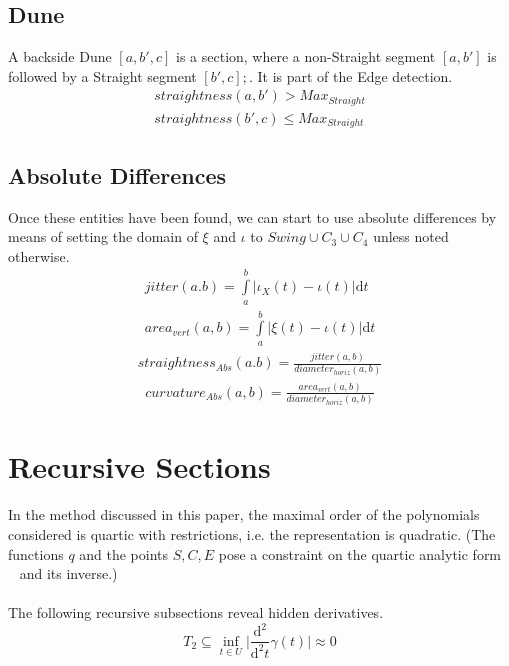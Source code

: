 \documentclass{report}
\begin{document}
\subsection{Dune}
A backside Dune $[a,b',c]$ is a section, where a non-Straight segment $[a,b']$ is followed by a Straight segment $[b',c]; $. It is part of the Edge detection.
\begin{align}
straightness(a,b')>Max_{Straight}\\ straightness(b',c)\leq Max_{Straight}
\end{align}

\subsection*{Absolute Differences}
Once these entities have been found, we can start to use absolute differences by means of setting the domain of $\xi$ and $\iota$ to $Swing \cup C_{3} \cup C_{4}$ unless noted otherwise.
\begin{align}
jitter(a.b)=\int \limits _{a}^{b}\lvert \iota_{X}(t) - \iota(t) \rvert \mathrm{d}t\\
area_{vert}(a,b)=\int \limits _{a}^{b} \lvert \xi(t)-\iota(t) \rvert \mathrm{d}t
\end{align}
\begin{align}
straightness_{Abs}(a.b)=\frac{jitter(a,b)}{diameter_{horiz}(a,b)}
\end{align}
\begin{align}
curvature_{Abs}(a,b) = \frac{area_{vert}(a,b)}{diameter_{horiz}(a,b)}
\end{align}

\section{Recursive Sections}
In the method discussed in this paper, the maximal order of the polynomials considered is quartic with restrictions, i.e. the representation is quadratic.  (The functions $q$ and the points $S,C,E$ pose a constraint on the quartic analytic form ~\cite[Spline\_CharacteristicPolynomials.nb]{Stopeight} and its inverse.)\\\\
The following recursive subsections reveal hidden derivatives.
\begin{equation}
T_{2} \subseteq \inf_{t \in U} \lvert \frac{\mathrm{d}^2}{\mathrm{d}^2t}\gamma(t) \rvert \approx 0
\end{equation}
\end{document}
